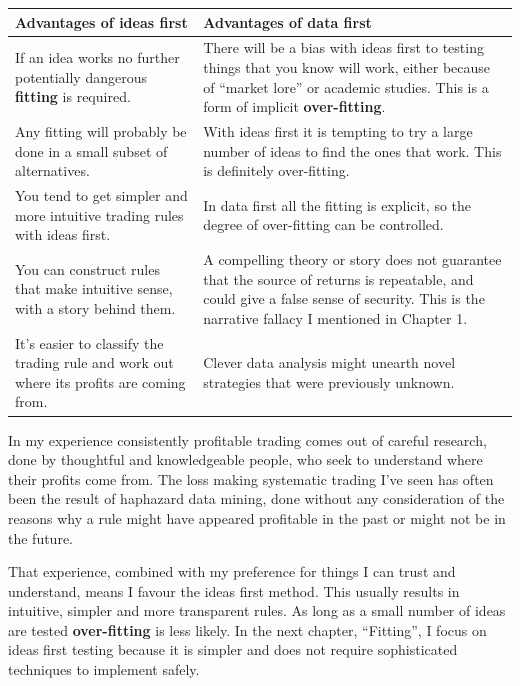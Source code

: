 \noindent\begin{center} \begin{tabularx}{\textwidth}{@{} Y Y@{}}
\toprule
\textbf{Advantages of ideas first} & \textbf{Advantages of data first} \\
\midrule
If an idea works no further potentially dangerous \textbf{fitting} is required. &There will be a bias with ideas first to testing things that you know will work, either because of ``market lore'' or academic studies. This is a form of implicit \textbf{over-fitting}. \\
\hline
Any fitting will probably be done in a small subset of alternatives. &With ideas first it is tempting to try a large number of ideas to find the ones that work. This is definitely over-fitting. \\
\hline
You tend to get simpler and more intuitive trading rules with ideas first. &In data first all the fitting is explicit, so the degree of over-fitting can be controlled. \\
\hline
You can construct rules that make intuitive sense, with a story behind them. &A compelling theory or story does not guarantee that the source of returns is repeatable, and could give a false sense of security. This is the narrative fallacy I mentioned in Chapter 1. \\
\hline
It's easier to classify the trading rule and work out where its profits are coming from. &Clever data analysis might unearth novel strategies that were previously unknown. \\
\bottomrule
\end{tabularx}
\end{center}

In my experience consistently profitable trading comes out of careful research, done by thoughtful and knowledgeable people, who seek to understand where their profits come from. The loss making systematic trading I've seen has often been the result of haphazard data mining, done without any consideration of the reasons why a rule might have appeared profitable in the past or might not be in the future.

That experience, combined with my preference for things I can trust and understand, means I favour the ideas first method. This usually results in intuitive, simpler and more transparent rules. As long as a small number of ideas are tested \textbf{over-fitting} is less likely. In the next chapter, ``Fitting'', I focus on ideas first testing because it is simpler and does not require sophisticated techniques to implement safely.

